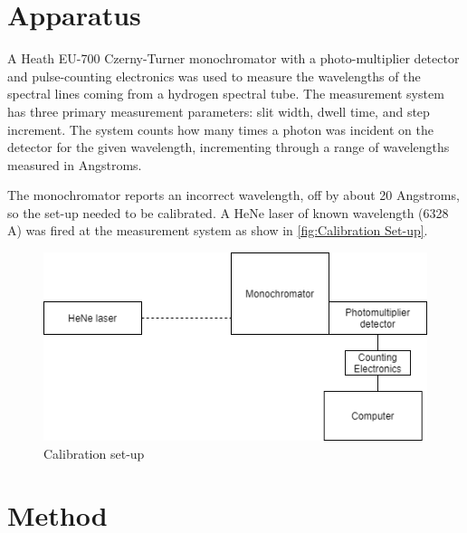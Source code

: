\documentclass[11pt]{article}
\numberwithin{equation}{section}
\numberwithin{figure}{section}
\numberwithin{table}{section}
\begin{document}
\section{Apparatus}\label{sec:Apparatus}
\par A Heath EU-700 Czerny-Turner monochromator with a photo-multiplier detector and pulse-counting electronics was used to measure the wavelengths of the spectral lines coming from a hydrogen spectral tube. The measurement system has three primary measurement parameters: slit width, dwell time, and step increment. The system counts how many times a photon was incident on the detector for the given wavelength, incrementing through a range of wavelengths measured in Angstroms.
\par The monochromator reports an incorrect wavelength, off by about 20 Angstroms, so the set-up needed to be calibrated. A HeNe laser of known wavelength (6328 A) was fired at the measurement system as show in \autoref{fig:Calibration Set-up}.

\begin{figure}[H]
    \begin{center}
        \includegraphics[width=.65\textwidth]{calibration.png}
        \caption{Calibration set-up}
        \label{fig:Calibration Set-up}
    \end{center}
\end{figure}

\section{Method}\label{sec:Method}
\end{document}
